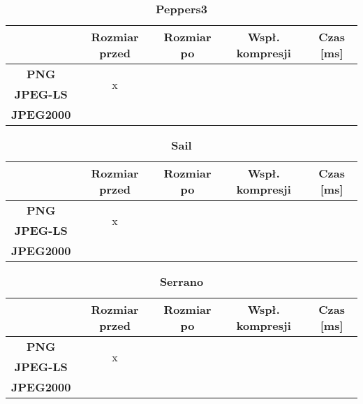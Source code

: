 \begin{table}[!h]
	\centering
	\caption{\textbf{Peppers3}}
	\label{my-label}
	\begin{tabular}{|c|c|c|c|c|}                                             
		\hline
		& \textbf{Rozmiar przed} & \textbf{Rozmiar po} & \textbf{Wspł. kompresji} & \textbf{Czas {[}ms{]}} \\ \hline 
		\textbf{PNG}      &          \multicolumn{1}{c|}{\multirow{2}{*}{x}}             &                     &                          &                             \\\cline{3-5}
		\textbf{JPEG-LS}  &                        &                     &                          &                          \\\cline{3-5}
		\textbf{JPEG2000} &                        &                     &                          &                      \\ \hline
	\end{tabular}
\end{table}

\begin{table}[!h]
	\centering
	\caption{\textbf{Sail}}
	\label{my-label}
	\begin{tabular}{|c|c|c|c|c|}                                             
		\hline
		& \textbf{Rozmiar przed} & \textbf{Rozmiar po} & \textbf{Wspł. kompresji} & \textbf{Czas {[}ms{]}} \\ \hline 
		\textbf{PNG}      &          \multicolumn{1}{c|}{\multirow{2}{*}{x}}             &                     &                          &                             \\\cline{3-5}
		\textbf{JPEG-LS}  &                        &                     &                          &                          \\\cline{3-5}
		\textbf{JPEG2000} &                        &                     &                          &                      \\ \hline
	\end{tabular}
\end{table}

\begin{table}[!h]
	\centering
	\caption{\textbf{Serrano}}
	\label{my-label}
	\begin{tabular}{|c|c|c|c|c|}                                             
		\hline
		& \textbf{Rozmiar przed} & \textbf{Rozmiar po} & \textbf{Wspł. kompresji} & \textbf{Czas {[}ms{]}} \\ \hline 
		\textbf{PNG}      &          \multicolumn{1}{c|}{\multirow{2}{*}{x}}             &                     &                          &                             \\\cline{3-5}
		\textbf{JPEG-LS}  &                        &                     &                          &                          \\\cline{3-5}
		\textbf{JPEG2000} &                        &                     &                          &                      \\ \hline
	\end{tabular}
\end{table}

